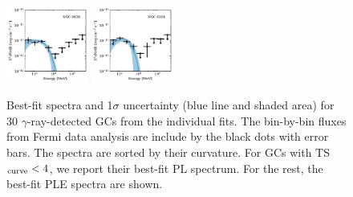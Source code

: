\documentclass[doublespace,draft,nopageskip]{VTthesis} %
\begin{document}
\begin{appendices}
\begin{figure}
\includegraphics[width=0.24\textwidth]{Figures/Globular/spectra/PLE_spectrum_25.pdf}
\includegraphics[width=0.24\textwidth]{Figures/Globular/spectra/PLE_spectrum_12.pdf}
\caption{Best-fit spectra and 1$\sigma$ uncertainty (blue line and shaded area) for 30 $\gamma$-ray-detected GCs from the individual fits. The bin-by-bin fluxes from Fermi data analysis are include by the black dots with error bars. The spectra are sorted by their curvature. For GCs with TS$_{\rm curve} < 4$, we report their best-fit PL spectrum. For the rest, the best-fit PLE spectra are shown.}
\label{fig:spectra}
\end{figure}


\end{appendices}
\end{document}
